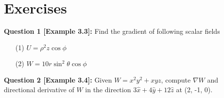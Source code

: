 \documentclass[12pt,a4paper]{article}
\begin{document}
\section{Exercises}
\noindent\textbf{Question 1 \cite{Sadiku}[Example 3.3]:} Find the gradient of following scalar fields
\begin{itemize}
\item[(1)] $U=\rho^2z\cos\phi$
\item[(2)] $W=10r\sin^2\theta\cos\phi$
\end{itemize}
\noindent\textbf{Question 2 \cite{Sadiku}[Example 3.4]:} Given $W=x^2y^2+xyz$, compute $\nabla W$ and directional derivative of $W$ in the direction $3\hat x+4\hat y+12\hat z$ at (2, -1, 0).\\[0.2cm]


\end{document}
